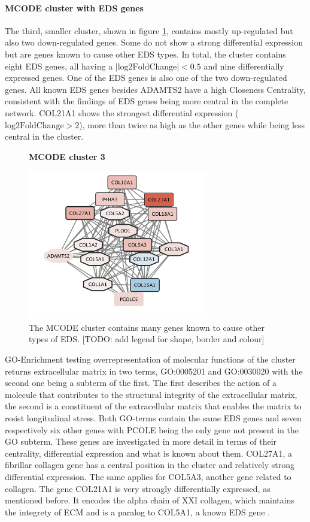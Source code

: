 \paragraph{MCODE cluster with EDS genes}
The third, smaller cluster, shown in figure \ref{fig:mcode3}, contains mostly up-regulated but also two down-regulated genes. Some do not show a strong differential expression but are genes known to cause other EDS types. In total, the cluster contains eight EDS genes, all having a $|\text{log2FoldChange}| < 0.5$ and nine differentially expressed genes. One of the EDS genes is also one of the two down-regulated genes. All known EDS genes besides ADAMTS2 have a high Closeness Centrality, consistent with the findings of EDS genes being more central in the complete network. COL21A1 shows the strongest differential expression ($\text{log2FoldChange} > 2$), more than twice as high as the other genes while being less central in the cluster.

\begin{figure}[htb!]
	\centering
	\caption*{\textbf{MCODE cluster 3}}
	\includegraphics[width=0.7\textwidth]{fig/MCODE-cluster3.png}
	\caption[MCODE cluster 3]{\centering The MCODE cluster contains many genes known to cause other types of EDS. [TODO: add legend for shape, border and colour]}
	\label{fig:mcode3}
\end{figure}

GO-Enrichment testing overrepresentation of molecular functions of the cluster returns extracellular matrix in two terms, GO:0005201 and GO:0030020 with the second one being a subterm of the first. The first describes the action of a molecule that contributes to the structural integrity of the extracellular matrix, the second is a constituent of the extracellular matrix that enables the matrix to resist longitudinal stress. Both GO-terms contain the same EDS genes and seven respectively six other genes with PCOLE being the only gene not present in the GO subterm. These genes are investigated in more detail in terms of their centrality, differential expression and what is known about them. COL27A1, a fibrillar collagen gene has a central position in the cluster and relatively strong differential expression. The same applies for COL5A3, another gene related to collagen. The gene COL21A1 is very strongly differentially expressed, as mentioned before. It encodes the alpha chain of XXI collagen, which maintains the integrety of ECM and is a paralog to COL5A1, a known EDS gene \cite{COL21A1}.

